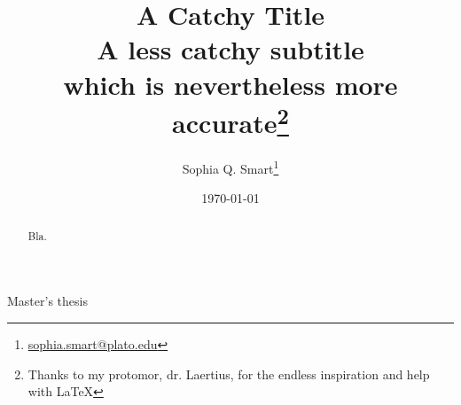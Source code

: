 

\author{Sophia Q. Smart\thanks{\href{mailto:sophia.smart@plato.edu}{sophia.smart@plato.edu}}}

\title{\textbf{A Catchy Title}\\A less catchy subtitle\\which is nevertheless more accurate\thanks{Thanks to my protomor, dr. Laertius, for the endless inspiration and help with \LaTeX{}}}

\date{\today}



\begin{titlepage}

\maketitle

\begin{center}	
\large{Master's thesis}
\end{center}

\vfill

\begin{abstract}
Bla.
\end{abstract}

\end{titlepage}
